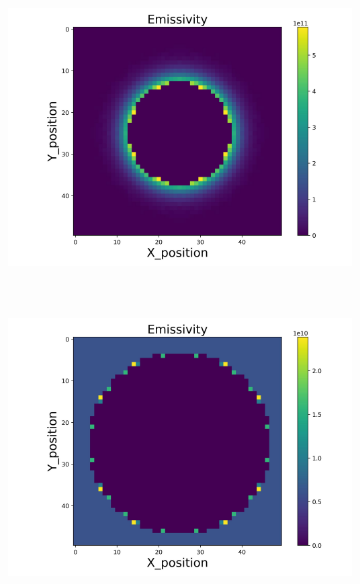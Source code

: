 \begin{figure}[p]
\begin{minipage}{\textwidth}
\begin{subfigure}{0.325\textwidth}
            \includegraphics[width=\textwidth]{figures/raw_data/31/exp/emi_cal.jpg}
        \end{subfigure}
    \end{minipage}\\
    \begin{minipage}{\textwidth}
        \centering
        \begin{subfigure}{0.325\textwidth}
            \centering
            \includegraphics[width=\textwidth]{figures/raw_data/32/exp/emi_cal.jpg}
        \end{subfigure}
        \begin{subfigure}{0.325\textwidth}

\end{subfigure}
\end{minipage}
\end{figure}
